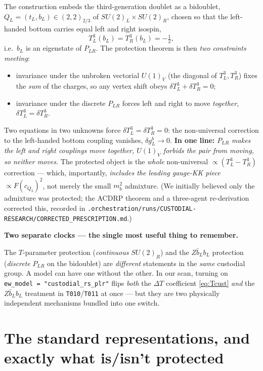 \documentclass[11pt]{article}
\newenvironment{callout}[1]{%
  \par\medskip\begin{shaded}\noindent\textbf{#1}\par\smallskip}{\end{shaded}\medskip}
\newcommand{\SUL}{SU(2)_L}
\newcommand{\SUR}{SU(2)_R}
\newcommand{\PLR}{P_{LR}}
\newcommand{\code}[1]{\texttt{#1}}
\newcommand{\dgL}{\delta g_L^b}
\theoremstyle{definition}
\begin{document}
The construction embeds the third-generation doublet as a bidoublet,
$Q_L=(t_L,b_L)\in(2,2)_{2/3}$ of $\SUL\times\SUR$, chosen so that the left-handed
bottom carries equal left and right isospin,
\begin{equation}
T^3_L(b_L) = T^3_R(b_L) = -\tfrac12 ,
\end{equation}
i.e.\ $b_L$ is an eigenstate of $\PLR$. The protection theorem is then
\emph{two constraints meeting}:
\begin{itemize}[leftmargin=1.4em]
\item invariance under the unbroken vectorial $U(1)_V$ (the diagonal of
$T^3_L,T^3_R$) fixes the \emph{sum} of the charges, so any vertex shift obeys
$\delta T^3_L + \delta T^3_R = 0$;
\item invariance under the discrete $\PLR$ forces left and right to move
\emph{together}, $\delta T^3_L = \delta T^3_R$.
\end{itemize}
Two equations in two unknowns force $\delta T^3_L = \delta T^3_R = 0$: the
non-universal correction to the left-handed bottom coupling vanishes,
$\dgL\to 0$. \textbf{In one line:} \emph{$\PLR$ makes the left and right couplings
move together, $U(1)_V$ forbids the pair from moving, so neither moves.} The
protected object is the \emph{whole} non-universal $\propto(T^3_L-T^3_R)$
correction --- which, importantly, \emph{includes the leading gauge-KK piece}
$\propto F(c_{Q_3})^2$, not merely the small $m_b^2$ admixture. (We initially
believed only the admixture was protected; the ACDRP theorem and a three-agent
re-derivation corrected this, recorded in
\code{.orchestration/runs/CUSTODIAL-RESEARCH/CORRECTED\_PRESCRIPTION.md}.)

\begin{callout}{Two separate clocks --- the single most useful thing to remember.}
The $T$-parameter protection (\emph{continuous} $\SUR$) and the $Z\bar b_L b_L$
protection (\emph{discrete} $\PLR$ on the bidoublet) are \emph{different}
statements in the \emph{same} custodial group. A model can have one without the
other. In our scan, turning on \code{ew\_model = "custodial\_rs\_plr"} flips
\emph{both} the $\Delta T$ coefficient \eqref{eq:Tcust} \emph{and} the
$Z\bar b_L b_L$ treatment in \code{T010}/\code{T011} at once --- but they are two
physically independent mechanisms bundled into one switch.
\end{callout}

\section{The standard representations, and exactly what is/isn't protected}
\label{sec:reps}
\end{document}
